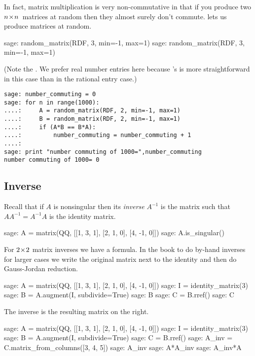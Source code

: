 In fact, matrix multiplication is very non-commutative 
in that if you produce two $n \! \times \! n$~matrices
at random then they almost surely don't commute.
\Sage{} lets us produce matrices at random.
\begin{sagecommandline}
sage: random_matrix(RDF, 3, min=-1, max=1)
sage: random_matrix(RDF, 3, min=-1, max=1)
\end{sagecommandline}
\noindent  
(Note the .
We prefer real number entries here because
\Sage's  
is more straightforward in this case than in the  
rational entry case.)

\begin{lstlisting}
sage: number_commuting = 0 
sage: for n in range(1000):                                       
....:     A = random_matrix(RDF, 2, min=-1, max=1)
....:     B = random_matrix(RDF, 2, min=-1, max=1)
....:     if (A*B == B*A):
....:         number_commuting = number_commuting + 1 
....: 
sage: print "number commuting of 1000=",number_commuting
number commuting of 1000= 0  
\end{lstlisting}

 


\subsection{Inverse}
Recall that if $A$ is nonsingular then its \textit{inverse} $A^{-1}$
is the matrix such that $AA^{-1}=A^{-1}A$ is the identity matrix. 
\begin{sagecommandline}
sage: A = matrix(QQ, [[1, 3, 1], [2, 1, 0], [4, -1, 0]])
sage: A.is_singular()
\end{sagecommandline}
\noindent
For $2 \! \times \! 2$ matrix inverses we have a formula.
In the book to do by-hand inverses for larger cases 
we write the original matrix next to the identity 
and then do Gauss-Jordan reduction.
\begin{sagecommandline}
sage: A = matrix(QQ, [[1, 3, 1], [2, 1, 0], [4, -1, 0]])
sage: I = identity_matrix(3)
sage: B = A.augment(I, subdivide=True)
sage: B
sage: C = B.rref()
sage: C
\end{sagecommandline}
\noindent
The inverse is the resulting matrix on the right.
\begin{sagecommandline}
sage: A = matrix(QQ, [[1, 3, 1], [2, 1, 0], [4, -1, 0]])
sage: I = identity_matrix(3)
sage: B = A.augment(I, subdivide=True)
sage: C = B.rref()
sage: A_inv = C.matrix_from_columns([3, 4, 5])
sage: A_inv
sage: A*A_inv
sage: A_inv*A
\end{sagecommandline}

